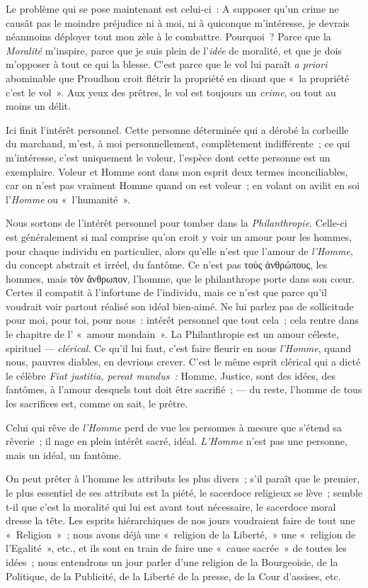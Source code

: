 \documentclass[french,twoside]{book} %
\begin{document}
Le problème qui se pose maintenant est celui-ci : A supposer qu’un crime ne causât pas le moindre préjudice  ni à moi, ni à quiconque m’intéresse, je devrais néanmoins déployer tout mon zèle à le combattre. Pourquoi ? Parce que la \emph{Moralité} m’inspire, parce que je suis plein de l’\emph{idée} de moralité, et que je dois m’opposer à tout ce qui la blesse. C’est parce que le vol lui paraît \emph{a priori} abominable que Proudhon croit flétrir la propriété en disant que « la propriété c’est le vol ». Aux yeux des prêtres, le vol est toujours un \emph{crime}, ou tout au moins un délit.\par
Ici finit l’intérêt personnel. Cette personne déterminée qui a dérobé la corbeille du marchand, m’est, à moi personnellement, complètement indifférente ; ce qui m’intéresse, c’est uniquement le voleur, l’espèce dont cette personne est un exemplaire. Voleur et Homme sont dans mon esprit deux termes inconciliables, car on n’est pas vraiment Homme quand on est voleur ; en volant on avilit en soi l’\emph{Homme} ou « l’humanité ».\par
Nous sortons de l’intérêt personnel pour tomber dans la \emph{Philanthropie}. Celle-ci est généralement si mal comprise qu’on croit y voir un amour pour les hommes, pour chaque individu en particulier, alors qu’elle n’est que l’amour de \emph{l’Homme}, du concept abstrait et irréel, du fantôme. Ce n’est pas τούς ἀνθρώπους, les hommes, mais τὸν ἄνθρωπον, l’homme, que le philanthrope porte dans son cœur. Certes il compatit à l’infortune de l’individu, mais ce n’est que parce qu’il voudrait voir partout réalisé son idéal bien-aimé. Ne lui parlez pas de sollicitude pour moi, pour toi, pour nous : intérêt personnel que tout cela ; cela rentre dans le chapitre de l’ « amour mondain ». La Philanthropie est un amour céleste, spirituel — \emph{clérical}. Ce qu’il lui faut, c’est faire fleurir en nous \emph{l’Homme}, quand nous, pauvres diables, en devrions crever. C’est le même esprit clérical qui a dicté le célèbre \emph{Fiat justitia, pereat mundus :} Homme, Justice, sont des idées, des fantômes, à l’amour desquels tout doit être sacrifié ; — du reste, l’homme  de tous les sacrifices est, comme on sait, le prêtre.\par
Celui qui rêve de \emph{l’Homme} perd de vue les personnes à mesure que s’étend sa rêverie ; il nage en plein intérêt sacré, idéal. \emph{L’Homme} n’est pas une personne, mais un idéal, un fantôme.\par
On peut prêter à l’homme les attributs les plus divers ; s’il paraît que le premier, le plus essentiel de ses attributs est la piété, le sacerdoce religieux se lève ; semble t-il que c’est la moralité qui lui est avant tout nécessaire, le sacerdoce moral dresse la tête. Les esprits hiérarchiques de nos jours voudraient faire de tout une « Religion » ; nous avons déjà une « religion de la Liberté, » une « religion de l’Egalité », etc., et ils sont en train de faire une « cause sacrée » de toutes les idées ; nous entendrons un jour parler d’une religion de la Bourgeoisie, de la Politique, de la Publicité, de la Liberté de la presse, de la Cour d’assises, etc.\par
\end{document}
